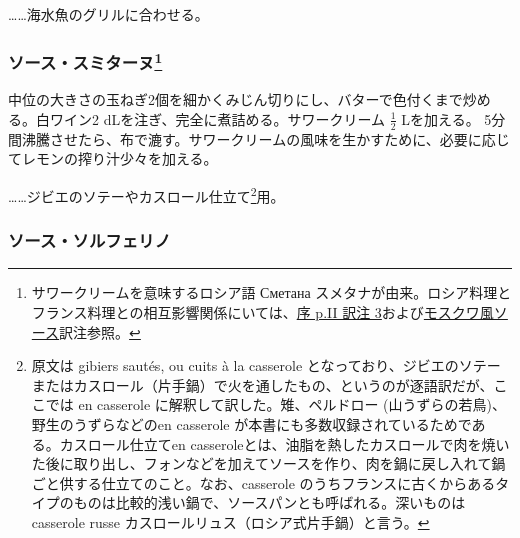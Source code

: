 \begin{recette}
\ldots{}\ldots{}海水魚のグリルに合わせる。

\hypertarget{sauce-smitane}{%
\subsubsection[ソース・スミターヌ]{\texorpdfstring{ソース・スミターヌ\footnote{サワークリームを意味するロシア語
   Сметана
  スメタナが由来。ロシア料理とフランス料理との相互影響関係にいては、\protect\hyperlink{service-russe}{序
  p.II 訳注
  3}および\protect\hyperlink{sauce-moscovite}{モスクワ風ソース}訳注参照。}}{ソース・スミターヌ}}\label{sauce-smitane}}



中位の大きさの玉ねぎ2個を細かくみじん切りにし、バターで色付くまで炒める。白ワイン2
dLを注ぎ、完全に煮詰める。サワークリーム \(\frac{1}{2}\) Lを加える。
5分間沸騰させたら、布で漉す。サワークリームの風味を生かすために、必要に応じてレモンの搾り汁少々を加える。

\ldots{}\ldots{}ジビエのソテーやカスロール仕立て\footnote{原文は gibiers
  sautés, ou cuits à la casserole
  となっており、ジビエのソテーまたはカスロール（片手鍋）で火を通したもの、というのが逐語訳だが、ここでは
  en casserole に解釈して訳した。雉、ペルドロー
  (山うずらの若鳥)、野生のうずらなどのen casserole
  が本書にも多数収録されているためである。カスロール仕立てen
  casseroleとは、油脂を熱したカスロールで肉を焼いた後に取り出し、フォンなどを加えてソースを作り、肉を鍋に戻し入れて鍋ごと供する仕立てのこと。なお、casserole
  のうちフランスに古くからあるタイプのものは比較的浅い鍋で、ソースパンとも呼ばれる。深いものはcasserole
  russe カスロールリュス（ロシア式片手鍋）と言う。}用。

\hypertarget{sauce-solferino}{%
\subsubsection{ソース・ソルフェリノ}\label{sauce-solferino}}


\end{recette}
